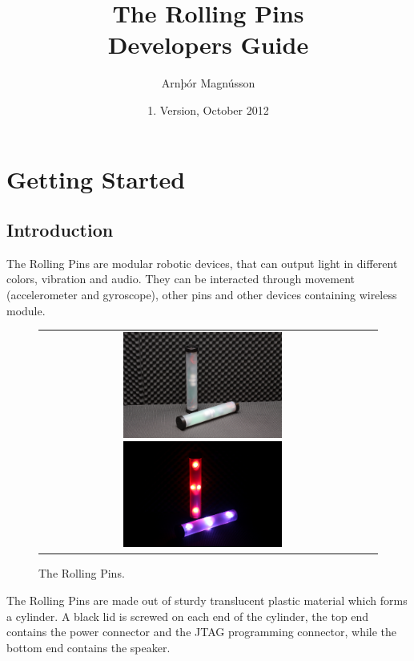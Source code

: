 \documentclass[a4paper, twoside, final]{book}%
\begin{document}
\frontmatter
\title{The Rolling Pins \\ Developers Guide}
\author{Arnþór Magnússon}
\date{1. Version, October 2012}
\maketitle
\tableofcontents

\part{Getting Started}

\chapter{Introduction}
The Rolling Pins are modular robotic devices, that can output light in different colors, vibration and audio. They can be interacted through movement (accelerometer and gyroscope), other pins and other devices containing wireless module.

\begin{figure}[H]
  \centering
  \begin{tabular}{cc}
    \includegraphics[width=0.5\textwidth]{figures/pins.JPG}
    \includegraphics[width=0.5\textwidth]{figures/pins_lights.JPG} &
  \end{tabular}
  \caption{The Rolling Pins.}
  \label{fig:rollingpins}
\end{figure}

The Rolling Pins are made out of sturdy translucent plastic material which forms a cylinder. A black lid is screwed on each end of the cylinder, the top end contains the power connector and the JTAG programming connector, while the bottom end contains the speaker. 
\end{document}
